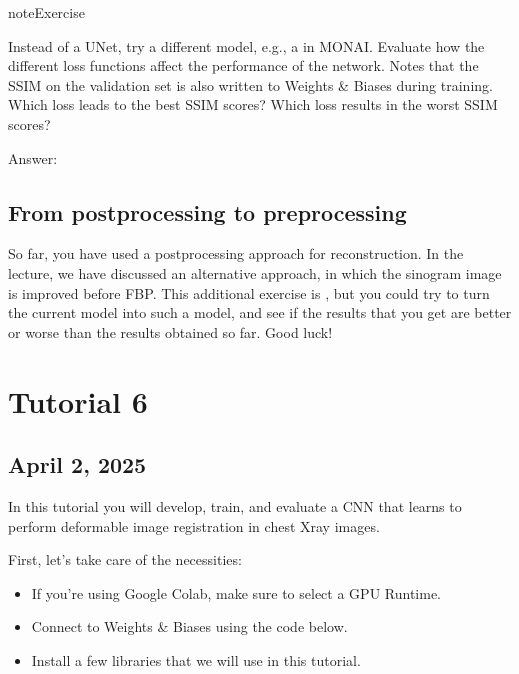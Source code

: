 \documentclass[letterpaper,10pt,english]{jupyterBook}
\begin{document}
\begin{sphinxadmonition}{note}{Exercise}

\sphinxAtStartPar
Instead of a U\sphinxhyphen{}Net, try a different model, e.g., a  in MONAI.
Evaluate how the different loss functions affect the performance of the network. Notes that the SSIM on the validation set is also written to Weights \& Biases during training. Which loss leads to the best SSIM scores? Which loss results in the worst SSIM scores?
\end{sphinxadmonition}

\sphinxAtStartPar
Answer:


\section{From post\sphinxhyphen{}processing to pre\sphinxhyphen{}processing}
\label{\detokenize{notebooks/Tutorial5_Reconstruction/Tutorial5_Reconstruction_student:from-post-processing-to-pre-processing}}
\sphinxAtStartPar
So far, you have used a post\sphinxhyphen{}processing approach for reconstruction. In the lecture, we have discussed an alternative  approach, in which the sinogram image is improved before FBP. This additional exercise is , but you could try to turn the current model into such a model, and see if the results that you get are better or worse than the results obtained so far. Good luck!

\sphinxstepscope


\chapter{Tutorial 6}
\label{\detokenize{notebooks/Tutorial6_Registration/Tutorial6_Registration_student:tutorial-6}}\label{\detokenize{notebooks/Tutorial6_Registration/Tutorial6_Registration_student::doc}}

\section{April 2, 2025}
\label{\detokenize{notebooks/Tutorial6_Registration/Tutorial6_Registration_student:april-2-2025}}
\sphinxAtStartPar
In this tutorial you will develop, train, and evaluate a CNN that learns to perform deformable image registration in chest X\sphinxhyphen{}ray images.

\sphinxAtStartPar
First, let’s take care of the necessities:
\begin{itemize}
\item {} 
\sphinxAtStartPar
If you’re using Google Colab, make sure to select a GPU Runtime.

\item {} 
\sphinxAtStartPar
Connect to Weights \& Biases using the code below.

\item {} 
\sphinxAtStartPar
Install a few libraries that we will use in this tutorial.

\end{itemize}
\end{document}
